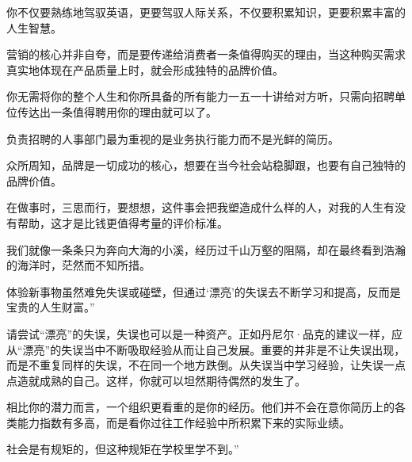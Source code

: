 \documentclass[UTF8,a4paper,8pt]{ctexbook}
\begin{document}
		
		你不仅要熟练地驾驭英语，更要驾驭人际关系，不仅要积累知识，更要积累丰富的人生智慧。
		
		
		营销的核心并非自夸，而是要传递给消费者一条值得购买的理由，当这种购买需求真实地体现在产品质量上时，就会形成独特的品牌价值。
		
		
		你无需将你的整个人生和你所具备的所有能力一五一十讲给对方听，只需向招聘单位传达出一条值得聘用你的理由就可以了。
		
		
		负责招聘的人事部门最为重视的是业务执行能力而不是光鲜的简历。
		
		
		众所周知，品牌是一切成功的核心，想要在当今社会站稳脚跟，也要有自己独特的品牌价值。
		
		
		在做事时，三思而行，要想想，这件事会把我塑造成什么样的人，对我的人生有没有帮助，这才是比钱更值得考量的评价标准。
		
		
		我们就像一条条只为奔向大海的小溪，经历过千山万壑的阻隔，却在最终看到浩瀚的海洋时，茫然而不知所措。
		
		
		体验新事物虽然难免失误或碰壁，但通过‘漂亮’的失误去不断学习和提高，反而是宝贵的人生财富。”
		
		请尝试“漂亮”的失误，失误也可以是一种资产。正如丹尼尔·品克的建议一样，应从“漂亮”的失误当中不断吸取经验从而让自己发展。重要的并非是不让失误出现，而是不重复同样的失误，不在同一个地方跌倒。从失误当中学习经验，让失误一点点造就成熟的自己。这样，你就可以坦然期待偶然的发生了。
		
		
		相比你的潜力而言，一个组织更看重的是你的经历。他们并不会在意你简历上的各类能力指数有多高，而是看你过往工作经验中所积累下来的实际业绩。
		
		
		社会是有规矩的，但这种规矩在学校里学不到。”
	\newpage
\end{document}
